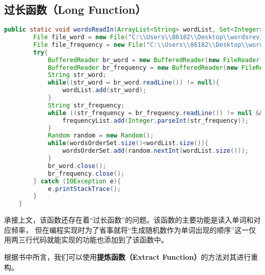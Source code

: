 \documentclass[a4paper]{article}
\begin{document}
\subsection{过长函数（Long Function）}
\begin{lstlisting}[language={java}]
    public static void wordsReadIn(ArrayList<String> wordList, Set<Integer> wordsOrderSet, ArrayList<Integer> frequencyList){
        File file_word = new File("C:\\Users\\86182\\Desktop\\wordsreview.txt");
        File file_frequency = new File("C:\\Users\\86182\\Desktop\\wordsFrequency.txt");
        try{
            BufferedReader br_word = new BufferedReader(new FileReader(file_word));
            BufferedReader br_frequency = new BufferedReader(new FileReader(file_frequency));
            String str_word;
            while((str_word = br_word.readLine()) != null){
                wordList.add(str_word);
            }
            String str_frequency;
            while ((str_frequency = br_frequency.readLine()) != null && !str_frequency.equals("")){
                frequencyList.add(Integer.parseInt(str_frequency));
            }
            Random random = new Random();
            while(wordsOrderSet.size()<wordList.size()){
                wordsOrderSet.add(random.nextInt(wordList.size()));
            }
            br_word.close();
            br_frequency.close();
        } catch (IOException e){
            e.printStackTrace();
        }
    }
\end{lstlisting}

承接上文，该函数还存在着“过长函数”的问题。该函数的主要功能是读入单词和对应频率，
但在编程实现时为了省事就将“生成随机数作为单词出现的顺序”这一仅用两三行代码就能实现的功能也添加到了该函数中。

根据书中所言，我们可以使用\textbf{提炼函数（Extract Function）}的方法对其进行重构。
\end{document}
